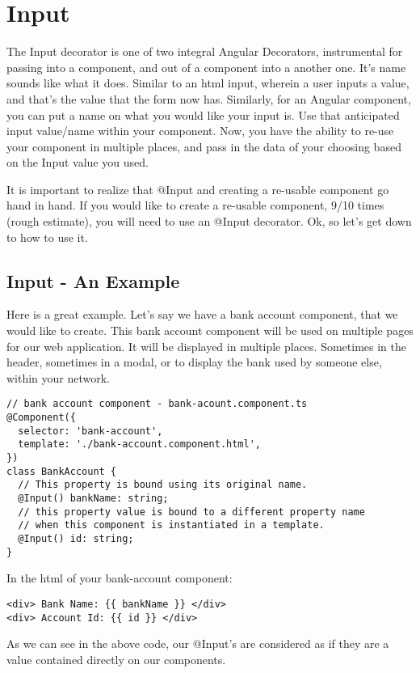 
\section{ Input }

The Input decorator is one of two integral Angular Decorators, instrumental
for passing into a component, and out of a component into a another one. It's
name sounds like what it does. Similar to an html input, wherein a user inputs
a value, and that's the value that the form now has. Similarly, for an Angular
component, you can put a name on what you would like your input is. Use that
anticipated input value/name within your component. Now, you have the ability to
re-use your component in multiple places, and pass in the data of your choosing
based on the Input value you used.

It is important to realize that @Input and creating a re-usable component go
hand in hand. If you would like to create a re-usable component, 9/10 times
(rough estimate), you will need to use an @Input decorator. Ok, so let's get
down to how to use it.

\subsection{ Input - An Example }

Here is a great example. Let's say we have a bank account component, that we
would like to create. This bank account component will be used on multiple
pages for our web application. It will be displayed in multiple places.
Sometimes in the header, sometimes in a modal, or to display the bank used by
someone else, within your network.

\begin{lstlisting}
// bank account component - bank-acount.component.ts
@Component({
  selector: 'bank-account',
  template: './bank-account.component.html',
})
class BankAccount {
  // This property is bound using its original name.
  @Input() bankName: string;
  // this property value is bound to a different property name
  // when this component is instantiated in a template.
  @Input() id: string;
}
\end{lstlisting}

In the html of your bank-account component:
\begin{lstlisting}
<div> Bank Name: {{ bankName }} </div>
<div> Account Id: {{ id }} </div>
\end{lstlisting}

As we can see in the above code, our @Input's are considered as if they are
a value contained directly on our components.

